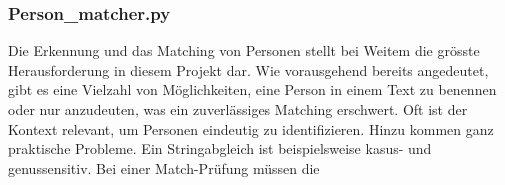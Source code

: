 \documentclass[12pt, a4paper, ngerman, bidi=default]{article}
\begin{document}
\begin{minipage}[t]{0.38\textwidth}
\justifying%
\subsubsection{Person\_matcher.py}\label{subsec:person_matcher.py}

Die Erkennung und das Matching von Personen stellt bei Weitem die grösste Herausforderung in diesem Projekt dar. Wie vorausgehend bereits angedeutet, gibt es eine Vielzahl von Möglichkeiten, eine Person in einem Text zu benennen oder nur anzudeuten, was ein zuverlässiges Matching erschwert. Oft ist der Kontext relevant, um Personen eindeutig zu identifizieren. Hinzu kommen ganz praktische Probleme. Ein Stringabgleich ist beispielsweise kasus- und genussensitiv. Bei einer Match-Prüfung müssen die 
\end{minipage}%
\hfill
\end{document}
